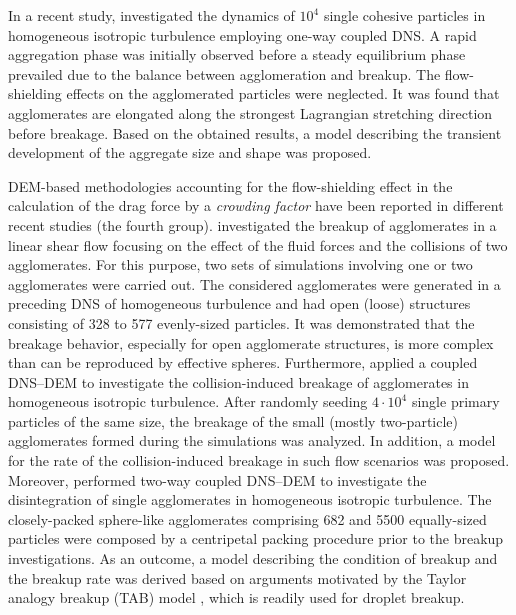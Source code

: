 In a recent study, \citet{zhao2021flocculation}
investigated the dynamics of $10^4$ single cohesive particles in
homogeneous isotropic turbulence employing one-way coupled DNS. A
rapid aggregation phase was initially observed before a steady
equilibrium phase prevailed due to the balance between agglomeration
and breakup. The flow-shielding effects on the agglomerated particles
were neglected.  It was found that agglomerates are elongated along
the strongest Lagrangian stretching direction before breakage. Based
on the obtained results, a
model describing the transient development of the aggregate size and
shape was proposed. \newline

DEM-based methodologies accounting for the flow-shielding effect in
the calculation of the drag force by a \emph{crowding factor} have
been reported in different recent studies (the fourth group).
\citet{dizaji2019collision} investigated the breakup of agglomerates
in a linear shear flow focusing on the effect of the fluid forces and
the collisions of two agglomerates. For this purpose, two sets of
simulations involving one or two agglomerates were carried out.  The
considered agglomerates were generated in a preceding DNS of
homogeneous turbulence and had open (loose) structures consisting of
328 to 577 evenly-sized particles. It was demonstrated that the
breakage behavior, especially for open agglomerate structures, is more
complex than can be reproduced by effective spheres.  Furthermore,
\citet{chen2020collision} applied a coupled DNS--DEM to investigate
the collision-induced breakage of agglomerates in homogeneous
isotropic turbulence. After randomly seeding $4\cdot10^4$ single
primary particles of the same size, the breakage of the small (mostly
two-particle) agglomerates formed during the simulations was
analyzed. In addition, a model for the rate of the collision-induced
breakage in such flow scenarios was proposed. Moreover,
\citet{yao2021deagglomeration} performed two-way coupled DNS--DEM to
investigate the disintegration of single agglomerates in homogeneous
isotropic turbulence. The closely-packed sphere-like agglomerates
comprising 682 and 5500 equally-sized particles were composed by a
centripetal packing procedure prior to the breakup investigations. As
an outcome, a model describing the condition of breakup and the
breakup rate was derived based on arguments motivated by the Taylor
analogy breakup (TAB) model \citep{o1987tab}, which is readily used
for droplet breakup. \newline

